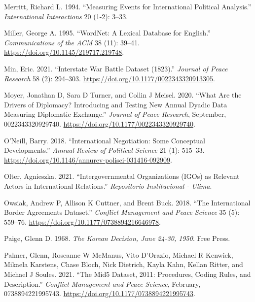 \documentclass{article}
\newlength{\cslhangindent}
\newlength{\cslentryspacingunit} %
\newenvironment{CSLReferences}[2] %
 {%
  \setlength{\parindent}{0pt}
  \ifodd #1
  \let\oldpar\par
  \def\par{\hangindent=\cslhangindent\oldpar}
  \fi
  \setlength{\parskip}{#2\cslentryspacingunit}
 }%
 {}
\begin{document}
\begin{CSLReferences}{1}{0}
\leavevmode{}%
Merritt, Richard L. 1994. {``Measuring Events for International
Political Analysis.''} \emph{International Interactions} 20 (1-2):
3--33.

\leavevmode{}%
Miller, George A. 1995. {``{WordNet}: A Lexical Database for
{English}.''} \emph{Communications of the ACM} 38 (11): 39--41.
\url{https://doi.org/10.1145/219717.219748}.

\leavevmode{}%
Min, Eric. 2021. {``Interstate {War Battle} Dataset
(1823).''} \emph{Journal of Peace Research} 58 (2):
294--303. \url{https://doi.org/10.1177/0022343320913305}.

\leavevmode{}%
Moyer, Jonathan D, Sara D Turner, and Collin J Meisel. 2020. {``What Are
the Drivers of Diplomacy? {Introducing} and Testing New Annual Dyadic
Data Measuring Diplomatic Exchange.''} \emph{Journal of Peace Research},
September, 0022343320929740.
\url{https://doi.org/10.1177/0022343320929740}.

\leavevmode{}%
O'Neill, Barry. 2018. {``International {Negotiation}: {Some Conceptual
Developments}.''} \emph{Annual Review of Political Science} 21 (1):
515--33. \url{https://doi.org/10.1146/annurev-polisci-031416-092909}.

\leavevmode{}%
Olter, Agnieszka. 2021. {``Intergovernmental Organizations ({IGOs}) as
Relevant Actors in {International Relations}.''} \emph{Repositorio
Institucional - Ulima}.

\leavevmode{}%
Owsiak, Andrew P, Allison K Cuttner, and Brent Buck. 2018. {``The
{International Border Agreements Dataset}.''} \emph{Conflict Management
and Peace Science} 35 (5): 559--76.
\url{https://doi.org/10.1177/0738894216646978}.

\leavevmode{}%
Paige, Glenn D. 1968. \emph{The {Korean Decision}, {June} 24-30, 1950}.
{Free Press}.

\leavevmode{}%
Palmer, Glenn, Roseanne W McManus, Vito D'Orazio, Michael R Kenwick,
Mikaela Karstens, Chase Bloch, Nick Dietrich, Kayla Kahn, Kellan Ritter,
and Michael J Soules. 2021. {``The {Mid5 Dataset}, 2011:
{Procedures}, Coding Rules, and Description.''} \emph{Conflict
Management and Peace Science}, February, 0738894221995743.
\url{https://doi.org/10.1177/0738894221995743}.


\end{CSLReferences}
\end{document}

